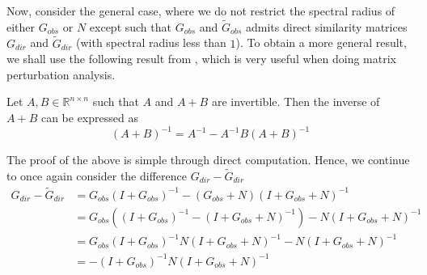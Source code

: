 \documentclass[../Thesis.tex]{subfiles}
\begin{document}








Now, consider the general case, where we do not restrict the spectral radius of either $G_{obs}$ or $N$ except such that $G_{obs}$ and $\tilde{G}_{obs}$ admits direct similarity matrices $G_{dir}$ and $\tilde{G}_{dir}$ (with spectral radius less than $1$). To obtain a more general result, we shall use the following result from \cite{On-Deriving-the-Inverse-of-a-Sum-of-Matrices}, which is very useful when doing matrix perturbation analysis.
\begin{theorem}\label{thm:Inverse of sum of matrices}
    Let $A,B\in \mathbb{R}^{n\times n}$ such that $A$ and $A+B$ are invertible. Then the inverse of $A+B$ can be expressed as
    $$\left(A+B\right)^{-1} = A^{-1} - A^{-1} B \left(A + B\right)^{-1}$$
\end{theorem}
The proof of the above is simple through direct computation. Hence, we continue to once again consider the difference $G_{dir} - \tilde{G}_{dir}$
\begin{align*}
    G_{dir} - \tilde{G}_{dir} & = G_{obs} \left(I + G_{obs}\right)^{-1} - \left(G_{obs} + N\right) \left(I + G_{obs} + N\right)^{-1}                             \\
                              & = G_{obs} \left( \left(I + G_{obs}\right)^{-1} - \left(I + G_{obs} + N\right)^{-1} \right) - N \left(I + G_{obs} + N\right)^{-1} \\
                              & = G_{obs} \left(I + G_{obs}\right)^{-1} N \left( I + G_{obs} + N \right)^{-1} - N \left(I + G_{obs} + N\right)^{-1}              \\
                              & = - \left(I + G_{obs}\right)^{-1} N \left(I + G_{obs} + N\right)^{-1}
\end{align*}
\end{document}
